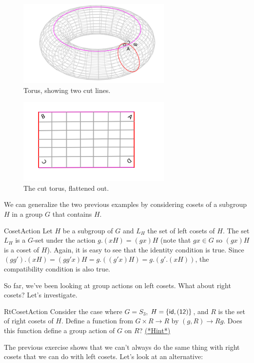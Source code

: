 \begin{figure}[ht]
\begin{center}
\includegraphics[width=3in]{images/Torus1.png}
\caption{Torus, showing two cut lines.}\label{fig:Torus1}
\end{center}
\end{figure}

\begin{figure}[ht]
\begin{center}
\includegraphics[width=3in]{images/Torus2.png}
\caption{The cut torus, flattened out.}\label{fig:Torus2}
\end{center}
\end{figure}

We can generalize the two previous examples by considering cosets of a subgroup $H$ in a group $G$ that contains $H$.

\begin{example}{CosetAction}
Let $H$ be a subgroup of $G$ and $L_H$ the set of left cosets of $H$. The set $L_H$ is a $G$-set under the action 
$g.(xH)=(gx)H$ (note that $gx\in G$ so $(gx)H$ is a coset of $H$).
Again, it is easy to see that the identity condition is true. Since $(gg').(xH) =(gg'x)H=g.((g'x)H)= g.(g'.(xH))$, the compatibility condition is also true.
\end{example}
So far, we've been looking at group actions on left cosets.  What about right cosets?  Let's investigate.

\begin{exercise}{RtCosetAction}
Consider the case where $G=S_3$, $H=\{\sf{id},(12)\}$, and $R$ is the set of right cosets of $H$.  Define a function from $G\times R\rightarrow R$ by $(g,R)\rightarrow Rg$. Does this function define a group action of $G$ on $R$? 
\hyperref[sec:actions:hints]{(*Hint*)}
\end {exercise}
The previous exercise shows that we can't always do the same thing with right cosets that we can do with left cosets.  Let's look at an alternative:  

